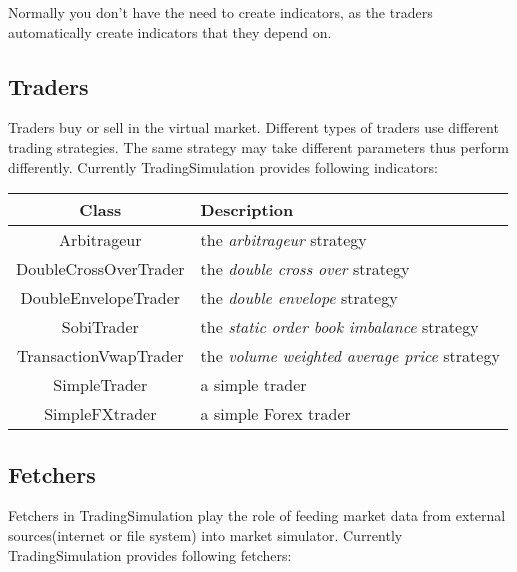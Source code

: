 Normally you don't have the need to create indicators, as the traders automatically create indicators that they depend on.

\subsection{Traders}

Traders buy or sell in the virtual market. Different types of traders use different trading strategies. The same strategy may take different parameters thus perform differently. Currently TradingSimulation provides following indicators:\\

\noindent
\begin{tabularx}{\textwidth}{|c|X|}
  \hline
  Class & Description  \\
  \hline
  Arbitrageur & the \emph{arbitrageur} strategy \\
  \hline
  DoubleCrossOverTrader & the \emph{double cross over} strategy  \\
  \hline
  DoubleEnvelopeTrader & the \emph{double envelope} strategy  \\
  \hline
  SobiTrader & the \emph{static order book imbalance} strategy  \\
  \hline
  TransactionVwapTrader & the \emph{volume weighted average price} strategy  \\
  \hline
  SimpleTrader & a simple trader \\
  \hline
  SimpleFXtrader & a simple Forex trader \\
  \hline
\end{tabularx}

\subsection{Fetchers}

Fetchers in TradingSimulation play the role of feeding market data from external sources(internet or file system) into market simulator. Currently TradingSimulation provides following fetchers:\\

